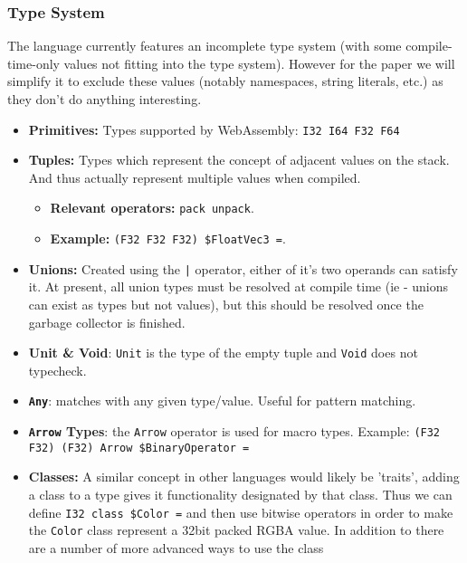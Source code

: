 \documentclass[acmsmall, review]{acmart}
\theoremstyle{definition}
\begin{document}
    
\subsubsection{Type System}
The language currently features an incomplete type system (with some compile-time-only values not fitting into the type system). However for the paper we will simplify it to exclude these values (notably namespaces, string literals, etc.) as they don't do anything interesting.

\begin{itemize}
    \item \textbf{Primitives:} Types supported by WebAssembly: \texttt{I32 I64 F32 F64}
    \item \textbf{Tuples:} Types which represent the concept of adjacent values on the stack. And thus actually represent multiple values when compiled.
    \begin{itemize}
        \item \textbf{Relevant operators:} \texttt{pack unpack}.
        \item \textbf{Example:} \texttt{(F32 F32 F32) \$FloatVec3 =}.
    \end{itemize}

    \item \textbf{Unions:} Created using the \texttt{|} operator, either of it's two operands can satisfy it. At present, all union types must be resolved at compile time (ie - unions can exist as types but not values), but this should be resolved once the garbage collector is finished.

    \item \textbf{Unit \& Void}: \texttt{Unit} is the type of the empty tuple and \texttt{Void} does not typecheck.

    \item \textbf{\texttt{Any}}: matches with any given type/value. Useful for pattern matching.

    \item \textbf{\texttt{Arrow} Types}: the \texttt{Arrow} operator is used for macro types. 
    Example: \texttt{(F32 F32) (F32) Arrow \$BinaryOperator =}

    \item \textbf{Classes:} A similar concept in other languages would likely be 'traits', adding a class to a type gives it functionality designated by that class. Thus we can define \texttt{I32 class \$Color =} and then use bitwise operators in order to make the \texttt{Color} class represent a 32bit packed RGBA value. In addition to there are a number of more advanced ways to use the class


\end{itemize}
\end{document}
